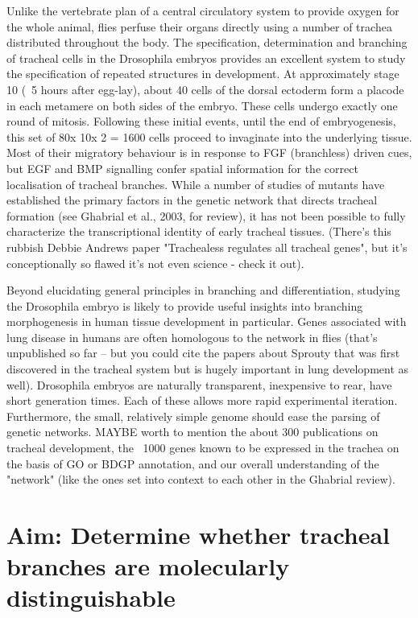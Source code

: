 \documentclass{proposal}
\begin{document}
Unlike the vertebrate plan of a central circulatory system to provide oxygen for the whole animal, flies perfuse their organs directly using a number of trachea distributed throughout the body.  The specification, determination and branching of tracheal cells in the Drosophila embryos provides an excellent system to study the specification of repeated structures in development.  At approximately stage 10 (~5 hours after egg-lay), about 40 cells of the dorsal ectoderm form a placode in each metamere on both sides of the embryo. These cells undergo exactly one round of mitosis. Following these initial events, until the end of embryogenesis, this set of 80x 10x 2 = 1600 cells proceed to invaginate into the underlying tissue. Most of their migratory behaviour is in response to FGF (branchless) driven cues, but EGF and BMP signalling confer spatial information for the correct localisation of tracheal branches. While a number of studies of mutants have established the primary factors in the genetic network that directs tracheal formation (see Ghabrial et al., 2003, for review), it has not been possible to fully characterize the transcriptional identity of early tracheal tissues. (There's this rubbish Debbie Andrews paper "Trachealess regulates all tracheal genes", but it's conceptionally so flawed it's not even science - check it out).

Beyond elucidating general principles in branching and differentiation, studying the Drosophila embryo is likely to provide useful insights into branching morphogenesis in human tissue development in particular.  Genes associated with lung disease in humans are often homologous to the network in flies (that's unpublished so far -- but you could cite the papers about Sprouty that was first discovered in the tracheal system but is hugely important in lung development as well).  Drosophila embryos are naturally transparent, inexpensive to rear, have short generation times. Each of these allows more rapid experimental iteration.  Furthermore, the small, relatively simple genome should ease the parsing of genetic networks.  MAYBE worth to mention the about 300 publications on tracheal development, the ~1000 genes known to be expressed in the trachea on the basis of GO or BDGP annotation, and our overall understanding of the "network" (like the ones set into context to each other in the Ghabrial review).


\section{Aim: Determine whether tracheal branches are molecularly distinguishable}
\end{document}
